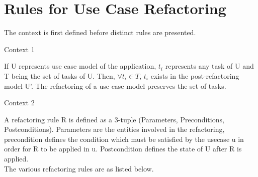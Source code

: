 \section{Rules for Use Case Refactoring}\label{section:selection_by_use_case/rules_for_use_case_refactoring}
The context is first defined before distinct rules are presented.
\\
\begin{shaded}Context 1 \end{shaded}
If U represents use case model of the application, $t_i$ represents any task of U and T being the set of tasks of U. Then, $\forall t_i \in T $, $t_i$ exists in the post-refactoring model U'. The refactoring of a use case model preserves the set of tasks.
\\
\begin{shaded}Context 2 \end{shaded}
A refactoring rule R is defined as a 3-tuple (Parameters, Preconditions, Postconditions). Parameters are the entities involved in the refactoring, precondition defines the condition which must be satisfied by the usecase u in order for R to be applied in u. Postcondition defines the state of U after R is applied.
\\
The various refactoring rules are as listed below.
\\
